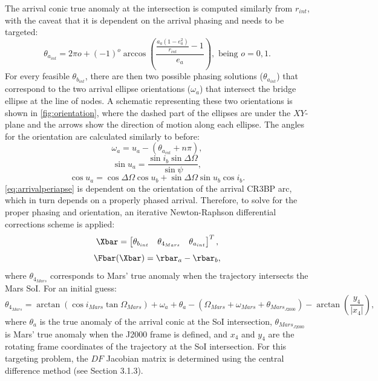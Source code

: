 The arrival conic true anomaly at the intersection is computed similarly from $r_{int}$, with the
caveat that it is dependent on the arrival phasing and needs to be targeted:
\begin{equation}
    \theta_{a_{int}}=2\pi o+(-1)^{o}\arccos(\frac{\frac{a_{a}(1-e_{a}^{2})}{r_{int}}-1}{e_{a}}),\text{ being }o=0,1.
    \label{eq:arrivalintersect}
\end{equation}
For every feasible $\theta_{b_{int}}$, there are then two possible phasing solutions
($\theta_{a_{int}}$) that correspond to the two arrival ellipse orientations ($\omega_{a}$) that
intersect the bridge ellipse at the line of nodes. A schematic representing these two orientations
is shown in \cref{fig:orientation}, where the dashed part of the ellipses are under the $XY$-plane
and the arrows show the direction of motion along each ellipse. The angles for the orientation are
calculated similarly to before:
\begin{equation}
    \omega_{a}=u_{a}-(\theta_{a_{int}}+n\pi),
    \label{eq:arrivalperiapse}
\end{equation}
\begin{equation}
    \sin u_{a}=\frac{\sin i_{b}\sin\Delta\Omega}{\sin\psi},
    \label{eq:arrivalsinu}
\end{equation}
\begin{equation}
    \cos u_{a}=\cos\Delta\Omega\cos u_{b}+\sin\Delta\Omega\sin u_{b}\cos i_{b}.
    \label{eq:arrivalcosu}
\end{equation}
\cref{eq:arrivalperiapse} is dependent on the orientation of the arrival CR3BP arc, which in turn
depends on a properly phased arrival. Therefore, to solve for the proper phasing and orientation,
an iterative Newton-Raphson differential corrections scheme is applied:
\begin{equation}
    \Xbar=\begin{bmatrix}   \theta_{b_{int}}    &   \theta_{4_{Mars}}   &   \theta_{a_{int}}    \end{bmatrix}^{T},
    \label{eq:MMATfreevar}
\end{equation}
\begin{equation}
    \Fbar(\Xbar)=\rbar_{a}-\rbar_{b},
    \label{eq:MMATconst}
\end{equation}
where $\theta_{4_{Mars}}$ corresponds to Mars' true anomaly when the trajectory intersects the Mars
SoI. For an initial guess:
\begin{equation}
    \theta_{4_{Mars}}=\arctan(\cos i_{Mars}\tan\Omega_{Mars})+\omega_{a}+\theta_{a}-(\Omega_{Mars}+\omega_{Mars}+\theta_{Mars_{J2000}})-\arctan(\frac{y_{4}}{|x_{4}|}),
    \label{eq:arrivalepoch}
\end{equation}
where $\theta_{a}$ is the true anomaly of the arrival conic at the SoI intersection,
$\theta_{Mars_{J2000}}$ is Mars' true anomaly when the J2000 frame is defined, and $x_{4}$ and
$y_{4}$ are the rotating frame coordinates of the trajectory at the SoI intersection. For this
targeting problem, the $DF$ Jacobian matrix is determined using the central difference method (see
Section 3.1.3).


